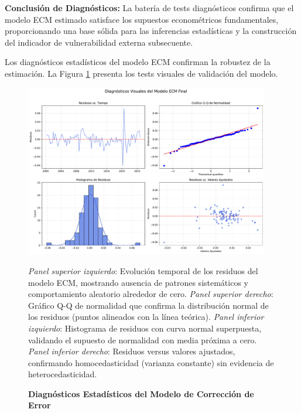 \documentclass[3p,11pt]{elsarticle}
\begin{document}
\textbf{Conclusión de Diagnósticos:} La batería de tests diagnósticos confirma que el modelo ECM estimado satisface los supuestos econométricos fundamentales, proporcionando una base sólida para las inferencias estadísticas y la construcción del indicador de vulnerabilidad externa subsecuente.


Los diagnósticos estadísticos del modelo ECM confirman la robustez de la estimación. 
La Figura \ref{fig:model_diagnostics} presenta los tests visuales de validación del modelo.

\begin{figure}[htbp]
    \centering
    
    \caption[Diagnósticos del Modelo ECM]{
        \textbf{Diagnósticos Estadísticos del Modelo de Corrección de Error}
    }
    
    \vspace{0.5cm}
    
    \includegraphics[width=0.95\textwidth]{../../notebooks/figures/model_diagnostics.pdf}
    
    \vspace{0.3cm}
    
    \parbox{0.95\textwidth}{
        \small
        \textit{Panel superior izquierdo}: Evolución temporal de los residuos del modelo ECM, 
        mostrando ausencia de patrones sistemáticos y comportamiento aleatorio alrededor de cero.
        \textit{Panel superior derecho}: Gráfico Q-Q de normalidad que confirma la distribución 
        normal de los residuos (puntos alineados con la línea teórica).
        \textit{Panel inferior izquierdo}: Histograma de residuos con curva normal superpuesta, 
        validando el supuesto de normalidad con media próxima a cero.
        \textit{Panel inferior derecho}: Residuos versus valores ajustados, confirmando 
        homocedasticidad (varianza constante) sin evidencia de heterocedasticidad.
    }
    
    \label{fig:model_diagnostics}
\end{figure}
\end{document}
